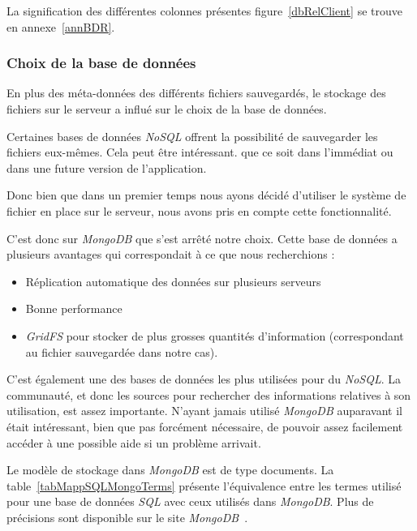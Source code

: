 \documentclass[a4paper,10pt, twoside]{report}
\begin{document}
\begin{spacing}{1.2}
La signification des différentes colonnes présentes figure~\ref{dbRelClient}
se trouve en annexe~\ref{annBDR}.

\subsubsection{Choix de la base de données}
En plus des méta-données des différents fichiers sauvegardés, le
stockage des fichiers sur le serveur a influé sur le choix de la base de
données. 

Certaines bases de données \textit{NoSQL} offrent la possibilité de 
sauvegarder les fichiers eux-mêmes. Cela peut être intéressant. que ce
soit dans l'immédiat ou dans une future version de l'application.

Donc bien que dans un premier temps nous ayons décidé d'utiliser le
système de fichier en place sur le serveur, nous avons pris en compte cette
fonctionnalité.

C'est donc sur \textit{MongoDB} que s'est arrêté notre choix. Cette base
de données a plusieurs avantages qui correspondait à ce que nous
recherchions :

\begin{itemize}
 \item Réplication automatique des données sur plusieurs serveurs
 \item Bonne performance
 \item \textit{GridFS} pour stocker de plus grosses quantités d'information
 (correspondant au fichier sauvegardée dans notre cas).
\end{itemize}

C'est également une des bases de données les plus utilisées pour du
\textit{NoSQL}. La communauté, et donc les sources pour rechercher des
informations relatives à son utilisation, est assez importante. N'ayant
jamais utilisé \textit{MongoDB} auparavant il était intéressant, bien que
pas forcément nécessaire, de pouvoir assez facilement accéder à une
possible aide si un problème arrivait.

Le modèle de stockage dans \textit{MongoDB} est de type documents. La
table~\ref{tabMappSQLMongoTerms} présente l'équivalence entre les termes
utilisé pour une base de données \textit{SQL} avec ceux utilisés dans
\textit{MongoDB}. Plus de précisions sont disponible sur le site
\textit{MongoDB}~\cite{refMappingSQLMDB}.


\end{spacing}
\end{document}
